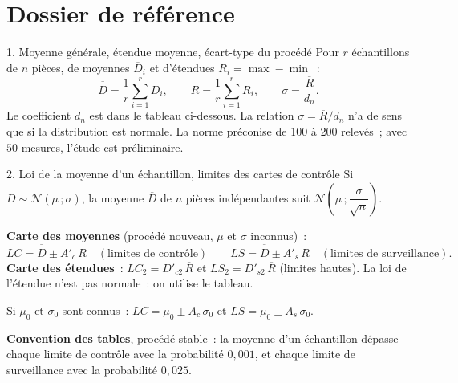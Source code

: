 \documentclass[a4paper,11pt]{article}
\newcommand{\Dbar}{\overline{D}}
\newcommand{\Dbb}{\overline{\overline{D}}}
\newcommand{\Rbar}{\overline{R}}
\begin{document}
\par\endgroup

\newpage
\section{Dossier de référence}

\begin{rappel}{1. Moyenne générale, étendue moyenne, écart-type du procédé}
\footnotesize
Pour $r$ échantillons de $n$ pièces, de moyennes $\Dbar_i$ et d'étendues $R_i = \max - \min$~:
\[
\Dbb = \frac{1}{r}\sum_{i=1}^{r}\Dbar_i, \qquad \Rbar = \frac{1}{r}\sum_{i=1}^{r}R_i, \qquad \sigma = \frac{\Rbar}{d_n}.
\]
Le coefficient $d_n$ est dans le tableau ci-dessous. La relation $\sigma = \Rbar/d_n$ n'a de sens que si la distribution est normale. La norme préconise de 100 à 200 relevés~; avec $50$ mesures, l'étude est préliminaire.
\end{rappel}

\begin{rappel}{2. Loi de la moyenne d'un échantillon, limites des cartes de contrôle}
\footnotesize
Si $D \sim \mathcal{N}(\mu\,;\sigma)$, la moyenne $\Dbar$ de $n$ pièces indépendantes suit $\mathcal{N}\!\left(\mu\,;\dfrac{\sigma}{\sqrt{n}}\right)$.

\smallskip
\textbf{Carte des moyennes} (procédé nouveau, $\mu$ et $\sigma$ inconnus)~:
\[
LC = \Dbb \pm A'_c\,\Rbar \quad(\text{limites de contrôle}) \qquad LS = \Dbb \pm A'_s\,\Rbar \quad(\text{limites de surveillance}).
\]
\textbf{Carte des étendues}~: $LC_2 = D'_{c2}\,\Rbar$ et $LS_2 = D'_{s2}\,\Rbar$ (limites hautes). La loi de l'étendue n'est pas normale~: on utilise le tableau.

\smallskip
Si $\mu_0$ et $\sigma_0$ sont connus~: $LC = \mu_0 \pm A_c\,\sigma_0$ et $LS = \mu_0 \pm A_s\,\sigma_0$.

\smallskip
\textbf{Convention des tables}, procédé stable~: la moyenne d'un échantillon dépasse chaque limite de contrôle avec la probabilité $0{,}001$, et chaque limite de surveillance avec la probabilité $0{,}025$.
\end{rappel}
\end{document}
